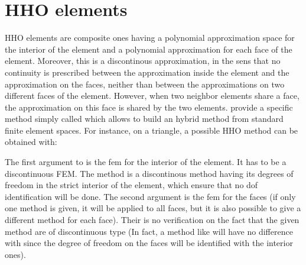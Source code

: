 \documentclass[a4paper,11pt,english]{sphinxmanual}
\begin{document}
\section{HHO elements}
\label{\detokenize{userdoc/hho:hho-elements}}
HHO elements are composite ones having a polynomial approximation space for the interior of the element and a polynomial approximation for each face of the element. Moreover, this is a discontinous approximation, in the sens that no continuity is prescribed between the approximation inside the element and the approximation on the faces, neither than between the approximations on two different faces of the element. However, when two neighbor elements share a face, the approximation on this face is shared by the two elements.  provide a specific method simply called  which allows to build an hybrid method from standard finite element spaces. For instance, on a triangle, a possible HHO method can be obtained with:

\begin{sphinxVerbatim}[commandchars=\\\{\}]
   
\end{sphinxVerbatim}

The first argument to  is the fem for the interior of the element. It has to be a discontinuous FEM. The method  is a discontinous method having its degrees of freedom in the strict interior of the element, which ensure that no dof identification will be done. The second argument is the fem for the faces (if only one method is given, it will be applied to all faces, but it is also possible to give a different method for each face). Their is no verification on the fact that the given method are of discontinuous type (In fact, a method like  will have no difference with  since the degree of freedom on the faces will be identified with the interior ones).
\end{document}
